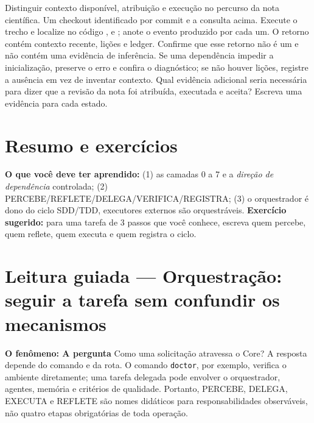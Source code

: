 \praticacore
{Distinguir contexto disponível, atribuição e execução no percurso da nota científica.}
{Um checkout identificado por commit e a consulta  acima.}
{Execute o trecho e localize no código ,  e
; anote o evento produzido por cada um.}
{O retorno contém contexto recente, lições e ledger. Confirme que esse retorno
não é um  e não contém uma evidência de inferência.}
{Se uma dependência impedir a inicialização, preserve o erro e confira o
diagnóstico; se não houver lições, registre a ausência em vez de inventar contexto.}
{Qual evidência adicional seria necessária para dizer que a revisão da nota
foi atribuída, executada e aceita? Escreva uma evidência para cada estado.}

\section{Resumo e exercícios}

\begin{resultado}
\textbf{O que você deve ter aprendido:} (1) as camadas 0 a 7 e a \emph{direção
de dependência} controlada; (2) PERCEBE/REFLETE/DELEGA/VERIFICA/REGISTRA; (3) o
orquestrador é dono do ciclo SDD/TDD, executores externos são orquestráveis.
\textbf{Exercício sugerido:} para uma tarefa de 3 passos que você conhece,
escreva quem percebe, quem reflete, quem executa e quem registra o ciclo.
\end{resultado}



\section[Leitura guiada]{Leitura guiada — Orquestração: seguir a tarefa sem confundir os mecanismos}


\begin{descricao}
\textbf{O fenômeno: A pergunta}  Como uma solicitação atravessa o Core? A resposta depende
do comando e da rota. O comando \texttt{doctor}, por exemplo, verifica o ambiente
diretamente; uma tarefa delegada pode envolver o orquestrador, agentes, memória
e critérios de qualidade. Portanto, PERCEBE, DELEGA, EXECUTA e REFLETE são
nomes didáticos para responsabilidades observáveis, não quatro etapas obrigatórias
de toda operação.
\end{descricao}

